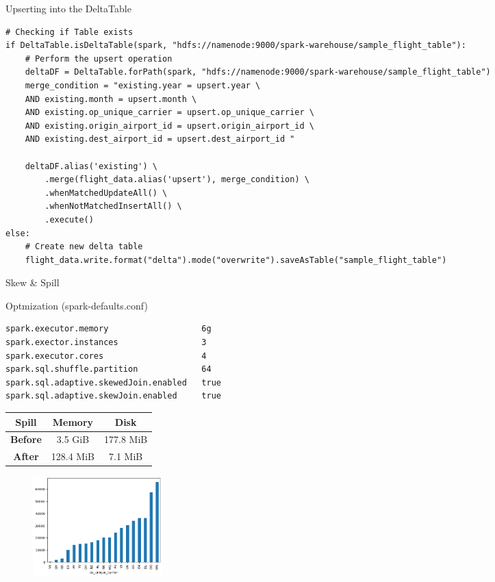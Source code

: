\documentclass[10pt]{beamer}
\begin{document}
\begin{frame}[fragile]{Upserting into the DeltaTable}
\begin{lstlisting}
# Checking if Table exists
if DeltaTable.isDeltaTable(spark, "hdfs://namenode:9000/spark-warehouse/sample_flight_table"):
    # Perform the upsert operation
    deltaDF = DeltaTable.forPath(spark, "hdfs://namenode:9000/spark-warehouse/sample_flight_table")
    merge_condition = "existing.year = upsert.year \
    AND existing.month = upsert.month \
    AND existing.op_unique_carrier = upsert.op_unique_carrier \
    AND existing.origin_airport_id = upsert.origin_airport_id \
    AND existing.dest_airport_id = upsert.dest_airport_id "

    deltaDF.alias('existing') \
        .merge(flight_data.alias('upsert'), merge_condition) \
        .whenMatchedUpdateAll() \
        .whenNotMatchedInsertAll() \
        .execute()  
else:
    # Create new delta table
    flight_data.write.format("delta").mode("overwrite").saveAsTable("sample_flight_table")
\end{lstlisting}

\end{frame}




\begin{frame}[fragile]{Skew \& Spill}
\begin{multicols}{2}

Optmization (spark-defaults.conf)
\begin{lstlisting}
spark.executor.memory                   6g
spark.exector.instances                 3
spark.executor.cores                    4
spark.sql.shuffle.partition             64
spark.sql.adaptive.skewedJoin.enabled   true
spark.sql.adaptive.skewJoin.enabled     true
\end{lstlisting}

\columnbreak
\begin{table}[]
    \centering
    \begin{tabular}{c|c|c}
        \textbf{Spill} & \textbf{Memory} & \textbf{Disk} \\
        \hline 
        \textbf{Before} & 3.5 GiB & 177.8 MiB \\
        \hline
        \textbf{After} & 128.4 MiB & 7.1 MiB 
        \end{tabular}
    \label{tab:spill}
\end{table}

\begin{figure}
    \centering
    \includegraphics[width=5cm]{images/skew.png}
    \label{fig:skew}
\end{figure}
\end{multicols}
\end{frame}
\end{document}
